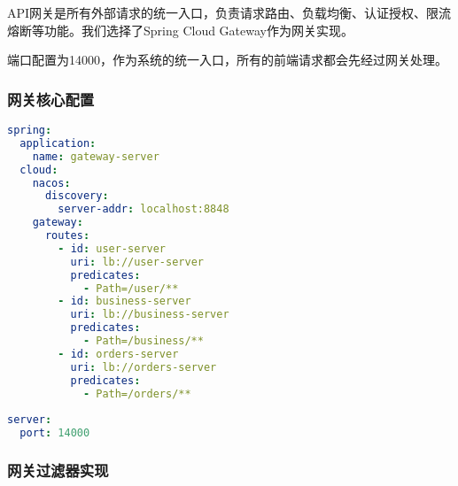 \documentclass[a4paper,12pt]{article}
\begin{document}
API网关是所有外部请求的统一入口，负责请求路由、负载均衡、认证授权、限流熔断等功能。我们选择了Spring Cloud Gateway作为网关实现。

端口配置为14000，作为系统的统一入口，所有的前端请求都会先经过网关处理。

\subsubsection{网关核心配置}

\begin{lstlisting}[caption=网关配置文件,language=YAML]
spring:
  application:
    name: gateway-server
  cloud:
    nacos:
      discovery:
        server-addr: localhost:8848
    gateway:
      routes:
        - id: user-server
          uri: lb://user-server
          predicates:
            - Path=/user/**
        - id: business-server
          uri: lb://business-server
          predicates:
            - Path=/business/**
        - id: orders-server
          uri: lb://orders-server
          predicates:
            - Path=/orders/**
            
server:
  port: 14000
\end{lstlisting}

\subsubsection{网关过滤器实现}
\end{document}
